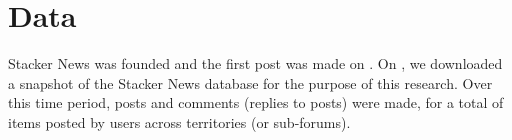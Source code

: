 \section{Data} \label{sec_data}

Stacker News was founded and the first post was made on . On , we downloaded a snapshot of the Stacker News database for the purpose of this research. Over this time period,  posts and  comments (replies to posts) were made, for a total of  items posted by  users across  territories (or sub-forums). 


